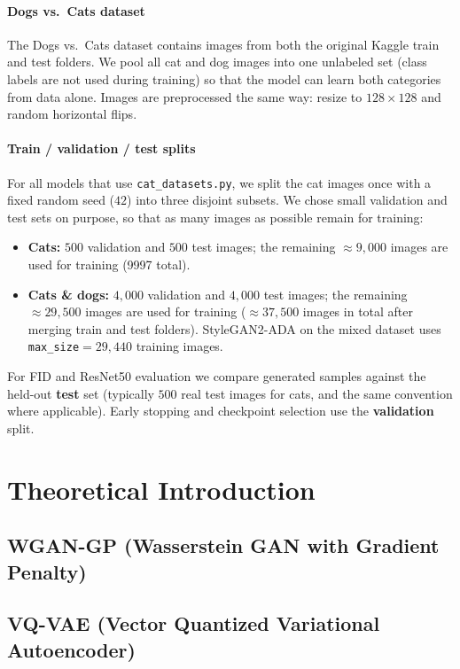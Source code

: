 \documentclass{article}
\begin{document}
\paragraph{Dogs vs.\ Cats dataset}
The Dogs vs.\ Cats dataset contains images from both the original Kaggle train and test folders.
We pool all cat and dog images into one unlabeled set (class labels are not used during training) so that the model can learn both categories from data alone.
Images are preprocessed the same way: resize to $128\times128$ and random horizontal flips.

\paragraph{Train / validation / test splits}
For all models that use \texttt{cat\_datasets.py}, we split the cat images once with a fixed random seed ($42$) into three disjoint subsets.
We chose small validation and test sets on purpose, so that as many images as possible remain for training:
\begin{itemize}
    \item \textbf{Cats:} $500$ validation and $500$ test images; the remaining $\approx 9{,}000$ images are used for training (9997 total).
    \item \textbf{Cats \& dogs:} $4{,}000$ validation and $4{,}000$ test images; the remaining $\approx 29{,}500$ images are used for training ($\approx 37{,}500$ images in total after merging train and test folders).
    StyleGAN2-ADA on the mixed dataset uses \texttt{max\_size}$=29{,}440$ training images.
\end{itemize}
For FID and ResNet50 evaluation we compare generated samples against the held-out \textbf{test} set (typically $500$ real test images for cats, and the same convention where applicable).
Early stopping and checkpoint selection use the \textbf{validation} split.

\section{Theoretical Introduction}

\subsection{WGAN-GP (Wasserstein GAN with Gradient Penalty)}

\subsection{VQ-VAE (Vector Quantized Variational Autoencoder)}
\end{document}
